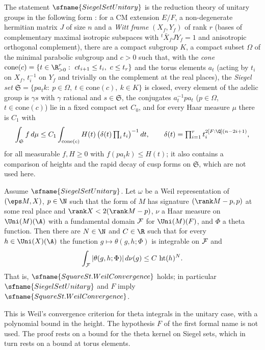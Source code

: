 The statement $\sfname{SiegelSetUnitary}$ is the reduction theory of unitary groups in the following form
\cite{Borel1969,MoeglinWaldspurger1995}: for a CM extension $E/F$, a non-degenerate hermitian matrix $J$ of size $n$ and a
\emph{Witt frame} $(X_f,Y_f)$ of rank $r$ (bases of complementary maximal isotropic subspaces with ${}^t\bar X_fJY_f=1$ and
anisotropic orthogonal complement), there are a compact subgroup $K$, a compact subset $\Omega$ of the minimal parabolic
subgroup and $c>0$ such that, with the \emph{cone} $\mathrm{cone}(c)=\{t\in\R_{>0}^r:\ ct_{i+1}\le t_i,\ c\le t_r\}$ and the
torus elements $a_t$ (acting by $t_i$ on $X_f$, $t_i^{-1}$ on $Y_f$ and trivially on the complement at the real places), the
\emph{Siegel set} $\mathfrak S=\{pa_tk:\ p\in\Omega,\ t\in\mathrm{cone}(c),\ k\in K\}$ is closed, every element of the adelic group
is $\gamma s$ with $\gamma$ rational and $s\in\mathfrak S$, the conjugates $a_t^{-1}pa_t$ ($p\in\Omega$, $t\in\mathrm{cone}(c)$)
lie in a fixed compact set $C_0$, and for every Haar measure $\mu$ there is $C_1$ with
\[
\int_{\mathfrak S}f\,d\mu\le C_1\int_{\mathrm{cone}(c)}H(t)\,\bigl(\delta(t)\textstyle\prod_it_i\bigr)^{-1}\,dt,\qquad
\delta(t)=\prod_{i=1}^rt_i^{2[F:\Q](n-2i+1)},
\]
for all measurable $f,H\ge0$ with $f(pa_tk)\le H(t)$; it also contains a comparison of heights and the rapid decay of cusp
forms on $\mathfrak S$, which are not used here.

\begin{theorem}\label{pf:sh-theta:weilconv}
Assume $\sfname{SiegelSetUnitary}$. Let $\omega$ be a Weil representation of $(\eps M,X)$, $p\in\N$ such that the form of
$M$ has signature $(\rank M-p,p)$ at some real place and $\rank X<2(\rank M-p)$, $\nu$ a Haar measure on $\Uni(M)(\A)$
with a fundamental domain $\mathcal{F}$ for $\Uni(M)(F)$, and $\Phi$ a theta function. Then there are $N\in\N$ and $C\in\R$
such that for every $h\in\Uni(X)(\A)$ the function $g\mapsto\theta(g,h;\Phi)$ is integrable on $\mathcal{F}$ and
\[
\int_{\mathcal{F}}|\theta(g,h;\Phi)|\,d\nu(g)\le C\,\operatorname{ht}(h)^N .
\]
That is, $\sfname{SquareSt.WeilConvergence}$ holds; in particular $\sfname{SiegelSetUnitary}$ and $F$ imply
$\sfname{SquareSt.WeilConvergence}$.
\end{theorem}

This is Weil's convergence criterion for theta integrals \cite{Weil1965} in the unitary case, with a polynomial bound in the
height. The hypothesis $F$ of the first formal name is not used. The proof rests on a bound for the theta kernel on Siegel
sets, which in turn rests on a bound at torus elements.

